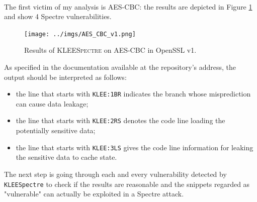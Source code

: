 \documentclass[12pt,a4paper]{book}
\theoremstyle{definition}
\begin{document}
	\paragraph{}The first victim of my analysis is AES-CBC: the results are depicted in Figure \ref{fig:result_cbc_v1} and show 4 Spectre vulnerabilities. 
	\begin{figure}[!h]
		\centering
		\texttt{[image: ../imgs/AES\_CBC\_v1.png]}
		\captionsetup{width=.9\linewidth}
		\caption{Results of \textsc{KLEESpectre} on AES-CBC in OpenSSL v1.}
		\label{fig:result_cbc_v1}
	\end{figure}
	As specified in the documentation available at the repository's address, the output should be interpreted as follows:
	\begin{itemize}
		\item the line that starts with \texttt{KLEE:1BR} indicates the branch whose misprediction can cause data leakage;
		\item the line that starts with \texttt{KLEE:2RS} denotes the code line loading the potentially sensitive data;
		\item the line that starts with \texttt{KLEE:3LS} gives the code line information for leaking the sensitive data to cache state.
	\end{itemize}
	The next step is going through each and every vulnerability detected by \texttt{KLEESpectre} to check if the results are reasonable and the snippets regarded as "vulnerable" can actually be exploited in a Spectre attack. 
	
\end{document}
